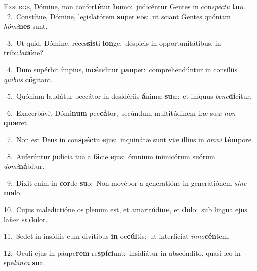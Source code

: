 \lettrine{\initial\textcolor{\initialcolor}{E}}{xsúrge,} Dómine, non confor\-\textbf{té}\-tur \textbf{ho}\-mo:~\star judicéntur Gentes in con\-\textit{spéc}\-\textit{tu} \textbf{tu}\-o.\\
{\numbfont\textcolor{\numbcolor}{~2.}}~Constítue, Dómine, legislatórem \textbf{su}\-per \textbf{e}\-os:~\star ut sciant Gentes quóniam \textit{hó}\-\textit{mi}\textbf{nes} sunt.\par
{\numbfont\textcolor{\numbcolor}{~3.}}~Ut quid, Dómine, reces\-\textbf{sís}\-ti \textbf{lon}\-ge,~\star déspicis in opportunitátibus, in tribu\-\textit{la}\-\textit{ti}\textbf{ó}ne?\par
{\numbfont\textcolor{\numbcolor}{~4.}}~Dum supérbit ímpius, in\-\textbf{cén}\-ditur \textbf{pau}\-per:~\star comprehendúntur in consíliis \textit{qui}\-\textit{bus} \textbf{có}\-gitant.\par
{\numbfont\textcolor{\numbcolor}{~5.}}~Quóniam laudátur peccátor in desidériis \textbf{á}\-nimæ \textbf{su}\-æ:~\star et iníquus \textit{be}\-\textit{ne}\textbf{dí}citur.\par
{\numbfont\textcolor{\numbcolor}{~6.}}~Exacerbávit Dómi\textbf{num} pec\-\textbf{cá}\-tor,~\star secúndum multitúdinem iræ su\textit{æ} \textit{non} \textbf{quæ}\-ret.\par
{\numbfont\textcolor{\numbcolor}{~7.}}~Non est Deus in con\-\textbf{spéc}\-tu \textbf{e}\-jus:~\star inquinátæ sunt viæ illíus in \textit{om}\-\textit{ni} \textbf{tém}\-pore.\par
{\numbfont\textcolor{\numbcolor}{~8.}}~Auferúntur judícia tua a \textbf{fá}\-cie \textbf{e}\-jus:~\star ómnium inimicórum suórum \textit{do}\-\textit{mi}\textbf{ná}bitur.\par
{\numbfont\textcolor{\numbcolor}{~9.}}~Dixit enim in \textbf{cor}\-de \textbf{su}\-o:~\star Non movébor a generatióne in generatiónem \textit{si}\-\textit{ne} \textbf{ma}\-lo.\par
{\numbfont\textcolor{\numbcolor}{10.}}~Cujus maledictióne os plenum est, et amaritúdi\-\textbf{ne}\-, et \textbf{do}\-lo:~\star sub lingua ejus la\textit{bor} \textit{et} \textbf{do}\-lor.\par
{\numbfont\textcolor{\numbcolor}{11.}}~Sedet in insídiis cum divítibus \textbf{in} oc\-\textbf{cúl}\-tis:~\star ut interfíciat \textit{in}\-\textit{no}\textbf{cén}tem.\par
{\numbfont\textcolor{\numbcolor}{12.}}~Oculi ejus in páupe\textbf{rem} re\-\textbf{spí}\-\textbf{ci}unt:~\star insidiátur in abscóndito, quasi leo in spe\-\textit{lún}\-\textit{ca} \textbf{su}\-a.\par
